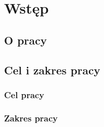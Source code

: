 \documentclass[../thesis.tex]{subfiles}
\begin{document}
\pagestyle{plain}
\chapter{Wstęp}
\section{O pracy}
\section{Cel i zakres pracy}
\subsection{Cel pracy}
\subsection{Zakres pracy}
\end{document}
